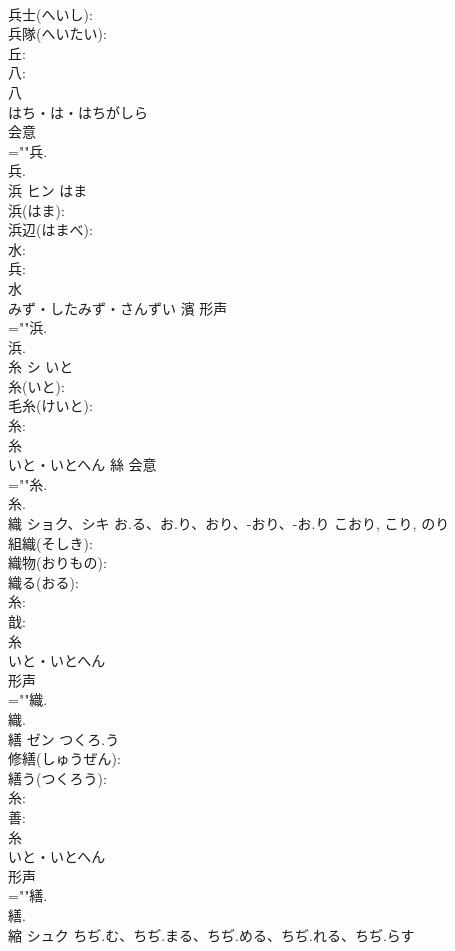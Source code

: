 \documentclass[8pt]{extreport}
\begin{document}
\begin{CJK}{UTF8}{min}
\\	兵士(へいし): 
\\	兵隊(へいたい): 
\\	丘: 
\\	八: 
\\	八	
\\	はち・は・はちがしら	
\\	会意 
\\	=""兵.
\\	兵.
\\	浜	ヒン	はま		
\\	浜(はま): 
\\	浜辺(はまべ): 
\\	水: 
\\	兵: 
\\	水	
\\	みず・したみず・さんずい	濱	形声 
\\	=""浜.
\\	浜.
\\	糸	シ	いと		
\\	糸(いと): 
\\	毛糸(けいと): 
\\	糸: 
\\	糸	
\\	いと・いとへん	絲	会意 
\\	=""糸.
\\	糸.
\\	織	ショク、シキ	お.る、お.り、おり、-おり、-お.り	こおり, こり, のり	
\\	組織(そしき): 
\\	織物(おりもの): 
\\	織る(おる): 
\\	糸: 
\\	戠: 
\\	糸	
\\	いと・いとへん	
\\	形声 
\\	=""織.
\\	織.
\\	繕	ゼン	つくろ.う		
\\	修繕(しゅうぜん): 
\\	繕う(つくろう): 
\\	糸: 
\\	善: 
\\	糸	
\\	いと・いとへん	
\\	形声 
\\	=""繕.
\\	繕.
\\	縮	シュク	ちぢ.む、ちぢ.まる、ちぢ.める、ちぢ.れる、ちぢ.らす		

\end{CJK}
\end{document}
